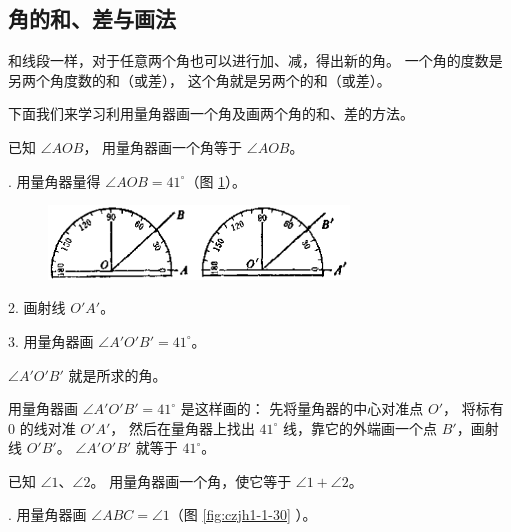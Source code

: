 \subsection{角的和、差与画法}\label{subsec:czjh1-1-7}

和线段一样，对于任意两个角也可以进行加、减，得出新的角。
一个角的度数是另两个角度数的和（或差）， 这个角就是另两个的和（或差）。

下面我们来学习利用量角器画一个角及画两个角的和、差的方法。

\liti 已知 $\angle AOB$， 用量角器画一个角等于 $\angle AOB$。

. 用量角器量得 $\angle AOB = 41^\circ$（图 \ref{fig:czjh1-1-29}）。

\begin{figure}[htbp]
    \centering
    \includegraphics[width=8cm]{../pic/czjh1-ch1-29.png}
    \caption{}\label{fig:czjh1-1-29}
\end{figure}

2. 画射线 $O'A'$。

3. 用量角器画 $\angle A'O'B' = 41^\circ$。

$\angle A'O'B'$ 就是所求的角。

用量角器画 $\angle A'O'B' = 41^\circ$ 是这样画的：
先将量角器的中心对准点 $O'$， 将标有 $0$ 的线对准 $O'A'$，
然后在量角器上找出 $41^\circ$ 线，靠它的外端画一个点 $B'$，画射线 $O'B'$。
$\angle A'O'B'$ 就等于 $41^\circ$。

\begin{figure}[htbp]
    \centering
    \begin{minipage}[b]{7cm}
        \centering
        
        \caption{}\label{fig:czjh1-1-30}
    \end{minipage}
    \qquad
    \begin{minipage}[b]{7cm}
        \centering
        
        \caption{}\label{fig:czjh1-1-31}
    \end{minipage}
\end{figure}

\liti 已知 $\angle 1$、$\angle 2$。 用量角器画一个角，使它等于 $\angle 1 + \angle 2$。

. 用量角器画 $\angle ABC = \angle 1$（图 \ref{fig:czjh1-1-30} ）。

